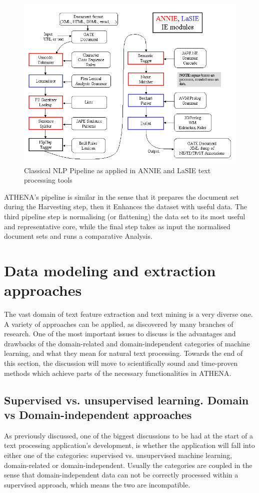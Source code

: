 \begin{figure}
    \centering
\includegraphics[width=0.8\columnwidth]{img/annie-pipe.png}
    \caption{Classical NLP Pipeline as applied in ANNIE and LaSIE text processing tools}
    \label{fig:nlpipe}
\end{figure}

ATHENA's pipeline is similar in the sense that it prepares the document set during the Harvesting step, then it Enhances the dataset with useful data. The third pipeline step is normalising (or flattening) the data set to its most useful and representative core, while the final step takes as input the normalised document sets and runs a comparative Analysis.

\section{Data modeling and extraction approaches}
The vast domain of text feature extraction and text mining is a very diverse one. A variety of approaches can be applied, as discovered by many branches of research. One of the most important issues to discuss is the advantages and drawbacks of the domain-related and domain-independent categories of machine learning, and what they mean for natural text processing. Towards the end of this section, the discussion will move to scientifically sound and time-proven methods which achieve parts of the necessary functionalities in ATHENA.

\subsection{Supervised vs. unsupervised learning. Domain vs Domain-independent approaches}
As previously discussed, one of the biggest discussions to be had at the start of a text processing application's development, is whether the application will fall into either one of the categories: supervised vs. unsupervised machine learning, domain-related or domain-independent. Usually the categories are coupled in the sense that domain-independent data can not be correctly processed within a supervised approach, which means the two are incompatible.

